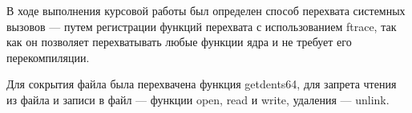 \Conclusion 

В ходе выполнения курсовой работы был определен способ перехвата системных вызовов --- путем регистрации функций перехвата с использованием ftrace, так как он позволяет перехватывать любые функции ядра и не требует его перекомпиляции. 

Для сокрытия файла была перехвачена функция getdents64, для запрета чтения из файла и записи в файл --- функции open, read и write, удаления --- unlink.